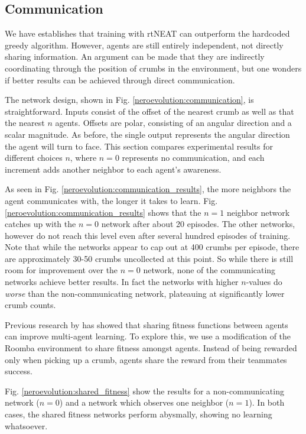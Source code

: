 \documentclass[conference]{IEEEtran}
\begin{document}
\subsection{Communication}


We have establishes that training with rtNEAT can outperform the hardcoded greedy algorithm. However, agents are still entirely independent, not directly sharing information. An argument can be made that they are indirectly coordinating through the position of crumbs in the environment, but one wonders if better results can be achieved through direct communication.

The network design, shown in Fig. \ref{neroevolution:communication}, is straightforward. Inputs consist of the offset of the nearest crumb as well as that the nearest $n$ agents. Offsets are polar, consisting of an angular direction and a scalar magnitude. As before, the single output represents the angular direction the agent will turn to face. 
This section compares experimental results for different choices $n$, where $n=0$ represents no communication, and each increment adds another neighbor to each agent's awareness.

As seen in Fig. \ref{neroevolution:communication_results}, the more neighbors the agent communicates with, the longer it takes to learn.  Fig. \ref{neroevolution:communication_results} shows that the $n=1$ neighbor network catches up with the $n=0$ network after about 20 episodes. The other networks, however do not reach this level even after several hundred episodes of training. Note that while the networks appear to cap out at 400 crumbs per episode, there are approximately 30-50 crumbs uncollected at this point. So while there is still room for improvement over the $n=0$ network, none of the communicating networks achieve better results. In fact the networks with higher $n$-values do \textit{worse} than the non-communicating network, plateauing at significantly lower crumb counts.

Previous research by \cite{rajagopalan2011role} has showed that sharing fitness functions between agents can improve multi-agent learning. 
To explore this, we use a modification of the Roomba environment to share fitness amongst agents. Instead of being rewarded only when picking up a crumb, agents share the reward from their teammates success. 

Fig. \ref{neroevolution:shared_fitness} show the results for a non-communicating network ($n=0$) and a network which observes one neighbor ($n=1$). In both cases, the shared fitness networks perform abysmally, showing no learning whatsoever.
\end{document}

